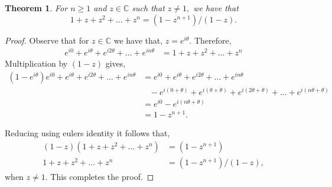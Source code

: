 \documentclass[letter]{article}
\newtheorem{theorem}{Theorem}
\newenvironment{menumerate}{%
  \edef\backupindent{\the\parindent}%
  \enumerate%
  \setlength{\parindent}{\backupindent}%
}{\endenumerate}
\begin{document}
\begin{menumerate}
        \begin{theorem}
            For $n\geq 1$ and $z \in \mathbb{C}$ such that $z \neq 1,$ we have that
            \begin{equation*}
                1 +z + z^2 + \dots + z^n = (1-z^{n+1})/(1-z).
            \end{equation*}
        \end{theorem}
        \begin{proof}
            Observe that for $z \in \mathbb{C}$ we have that, $z = e^{i\theta}.$ Therefore,
            \begin{equation*}
                \begin{aligned}
                    e^{i0} + e^{i\theta} + e^{i2\theta} + \dots + e^{in\theta} &= 1 +z + z^2 + \dots + z^n
                \end{aligned}
            \end{equation*}
            Multiplication by $(1 -z)$ gives, 
            \begin{equation*}
                \begin{aligned}
                    (1-e^{i\theta})e^{i0} + e^{i\theta} + e^{i2\theta} + \dots + e^{in\theta} &= e^{i0} + e^{i\theta} + e^{i2\theta} + \dots + e^{in\theta}\\
                    &\;\;\; - e^{i(0 + \theta)} + e^{i(\theta + \theta)} + e^{i(2\theta+\theta)} + \dots + e^{i(n\theta + \theta)} \\
                    &= e^{i0} - e^{i(n\theta + \theta)} \\
                    &= 1 - z^{n+1}.
                \end{aligned}
            \end{equation*}

            Reducing using eulers identity it follows that,
            \begin{equation*}
                \begin{aligned}
                    (1-z)(1 +z + z^2 + \dots + z^n) &= (1-z^{n+1})\\
                    1 +z + z^2 + \dots + z^n &= (1-z^{n+1})/(1-z),
                \end{aligned}
            \end{equation*}
            when $z \neq 1.$ This completes the proof.
        \end{proof}


\end{menumerate}
\end{document}
